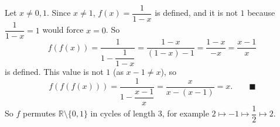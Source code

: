 Let $x\ne0,1$. Since $x\ne1$, $f(x)=\dfrac{1}{1-x}$ is defined, and it is not $1$ because $\dfrac{1}{1-x}=1$ would force $x=0$. So
\[
f(f(x))=\dfrac{1}{1-\dfrac{1}{1-x}}=\dfrac{1-x}{(1-x)-1}=\dfrac{1-x}{-x}=\dfrac{x-1}{x}
\]
is defined. This value is not $1$ (as $x-1\ne x$), so
\[
f(f(f(x)))=\dfrac{1}{1-\dfrac{x-1}{x}}=\dfrac{x}{x-(x-1)}=x. \qquad\blacksquare
\]
So $f$ permutes $\mathbb R\setminus\{0,1\}$ in cycles of length $3$, for example $2\mapsto-1\mapsto\dfrac{1}{2}\mapsto2$.
